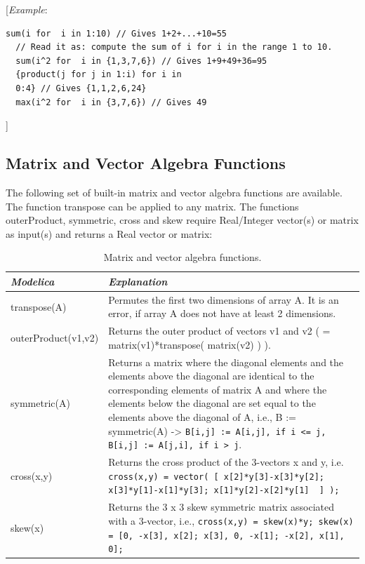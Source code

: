 \documentclass[10pt,a4paper]{report}
\def\doublelabel#1{\label{#1}\hypertarget{#1}{}}
\begin{document}
{[}\emph{Example}:

\begin{lstlisting}[language=modelica]
  sum(i for  i in 1:10) // Gives 1+2+...+10=55
  // Read it as: compute the sum of i for i in the range 1 to 10.
  sum(i^2 for  i in {1,3,7,6}) // Gives 1+9+49+36=95
  {product(j for j in 1:i) for i in
  0:4} // Gives {1,1,2,6,24}
  max(i^2 for  i in {3,7,6}) // Gives 49
\end{lstlisting}
{]}

\subsection{Matrix and Vector Algebra Functions}\doublelabel{matrix-and-vector-algebra-functions}

The following set of built-in matrix and vector algebra functions are
available. The function transpose can be applied to any matrix. The
functions outerProduct, symmetric, cross and skew require Real/Integer
vector(s) or matrix as input(s) and returns a Real vector or matrix:



\begin{longtable}[]{|p{3cm}|p{9cm}|}
\caption{Matrix and vector algebra functions.}\\
\hline
\emph{Modelica} & \emph{Explanation}\\ \hline
\endhead
transpose(A)
&
Permutes the first two dimensions of array A. It is an error, if array A
does not have at least 2 dimensions.\\ \hline
outerProduct(v1,v2)
&
Returns the outer product of vectors v1 and v2 ( = matrix(v1)*transpose(
matrix(v2) ) ).\\ \hline
symmetric(A)
&
Returns a matrix where the diagonal elements and the elements above the
diagonal are identical to the corresponding elements of matrix A and
where the elements below the diagonal are set equal to the elements
above the diagonal of A, i.e., B := symmetric(A) ->
  \lstinline!B[i,j] := A[i,j], if i <= j, ! \lstinline! B[i,j] := A[j,i], if i > j!.\\ \hline
cross(x,y)
&
Returns the cross product of the 3-vectors x and y, i.e.\newline
\lstinline! cross(x,y) = vector( [ x[2]*y[3]-x[3]*y[2];  x[3]*y[1]-x[1]*y[3]; x[1]*y[2]-x[2]*y[1]  ] );!\\ \hline
skew(x)
&
Returns the 3 x 3 skew symmetric matrix associated with a 3-vector,
  i.e., \lstinline!cross(x,y) = skew(x)*y; skew(x) = [0, -x[3], x[2]; x[3], 0, -x[1]; -x[2], x[1], 0];!\\ \hline
\end{longtable}
\end{document}
